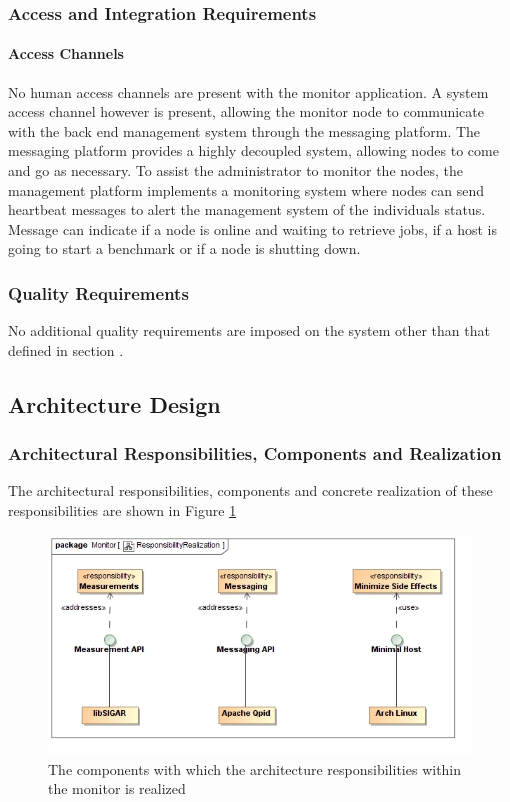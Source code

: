 \subsubsection{Access and Integration Requirements}
\label{sec:accessIntegrationRequirementsManagementSystem}
\paragraph*{Access Channels}
No human access channels are present with the monitor application. A system
access channel however is present, allowing the monitor node to communicate with
the back end management system through the messaging platform. The messaging
platform provides a highly decoupled system, allowing nodes to come and go as
necessary. To assist the administrator to monitor the nodes, the management
platform implements a monitoring system where nodes can send heartbeat messages
to alert the management system of the individuals status. Message can indicate
if a node is online and waiting to retrieve jobs, if a host is going to start a
benchmark or if a node is shutting down.

\subsubsection{Quality Requirements}
No additional quality requirements are imposed on the system other than that
defined in section \label{sec:overallQualityRequirement}.

\subsection{Architecture Design}
\subsubsection{Architectural Responsibilities, Components and Realization}
The architectural responsibilities, components and concrete realization of these 
responsibilities are shown in 
Figure \ref{fig:databaseResponsibilityRealization}
\begin{figure}[H]
	\begin{center}
	\includegraphics[scale=0.5]{../Diagrams and Charts/Monitor/ResponsibilityRealization.jpg}
	\caption{The components with which the architecture responsibilities within the monitor is realized}
	\label{fig:databaseResponsibilityRealization}
	\end{center}
\end{figure}


